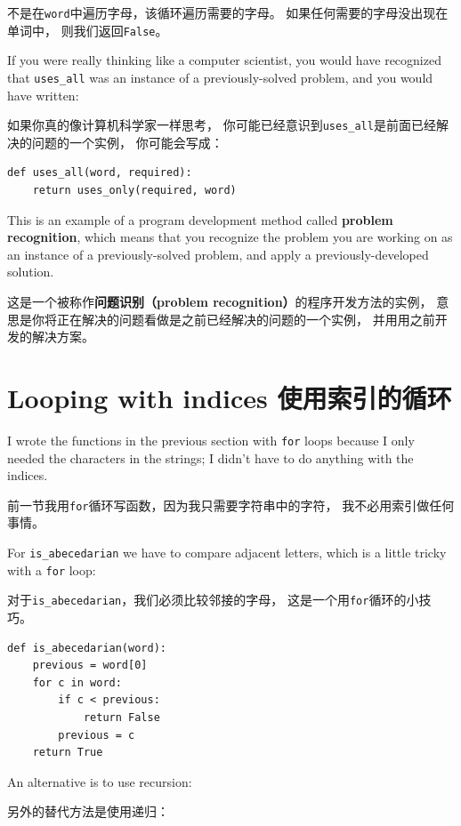 \documentclass[10pt]{book}
\begin{document}
\begin{CJK}{UTF8}{gbsn}
不是在{\tt word}中遍历字母，该循环遍历需要的字母。
如果任何需要的字母没出现在单词中，
则我们返回{\tt False}。

If you were really thinking like a computer scientist, you would
have recognized that \verb"uses_all" was an instance of a
previously-solved problem, and you would have written:

如果你真的像计算机科学家一样思考，
你可能已经意识到\verb"uses_all"是前面已经解决的问题的一个实例，
你可能会写成：

\begin{verbatim}
def uses_all(word, required):
    return uses_only(required, word)
\end{verbatim}
%
This is an example of a program development method called {\bf problem
recognition}, which means that you recognize the problem you are
working on as an instance of a previously-solved problem, and apply a
previously-developed solution.

这是一个被称作{\bf 问题识别（problem recognition）}的程序开发方法的实例，
意思是你将正在解决的问题看做是之前已经解决的问题的一个实例，
并用用之前开发的解决方案。

\section{Looping with indices 使用索引的循环}

I wrote the functions in the previous section with {\tt for}
loops because I only needed the characters in the strings; I didn't
have to do anything with the indices.

前一节我用{\tt for}循环写函数，因为我只需要字符串中的字符，
我不必用索引做任何事情。

For \verb"is_abecedarian" we have to compare adjacent letters,
which is a little tricky with a {\tt for} loop:

对于\verb"is_abecedarian"，我们必须比较邻接的字母，
这是一个用{\tt for}循环的小技巧。

\begin{verbatim}
def is_abecedarian(word):
    previous = word[0]
    for c in word:
        if c < previous:
            return False
        previous = c
    return True
\end{verbatim}


An alternative is to use recursion:

另外的替代方法是使用递归：


\end{CJK}
\end{document}
